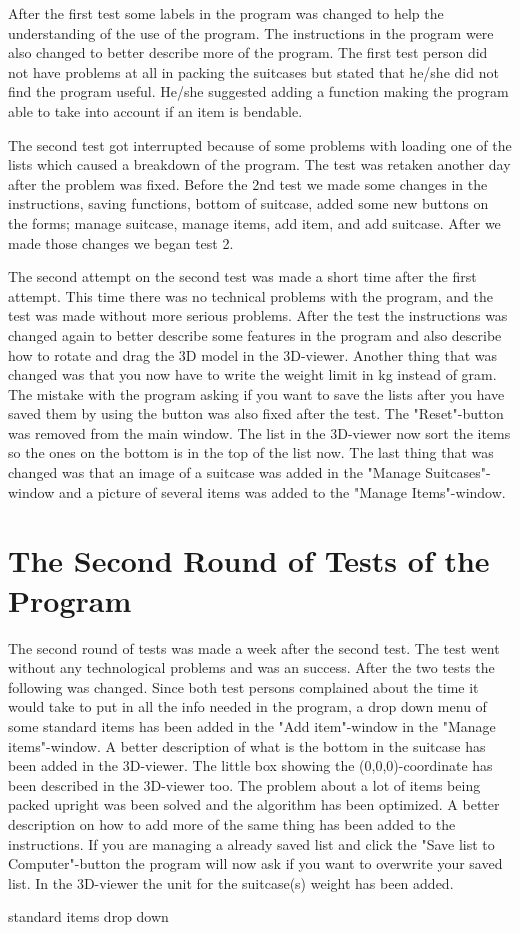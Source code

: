 After the first test some labels in the program was changed to help the understanding of the use of the program. The instructions in the program were also changed to better describe more of the program. The first test person did not have problems at all in packing the suitcases but stated that he/she did not find the program useful. He/she suggested adding a function making the program able to take into account if an item is bendable.

The second test got interrupted because of some problems with loading one of the lists which caused a breakdown of the program. The test was retaken another day after the problem was fixed. Before the 2nd test we made some changes in the instructions, saving functions, bottom of suitcase, added some new buttons on the forms; manage suitcase, manage items, add item, and add suitcase. After we made those changes we began test 2.

The second attempt on the second test was made a short time after the first attempt. This time there was no technical problems with the program, and the test was made without more serious problems. After the test the instructions was changed again to better describe some features in the program and also describe how to rotate and drag the 3D model in the 3D-viewer. Another thing that was changed was that you now have to write the weight limit in kg instead of gram. The mistake with the program asking if you want to save the lists after you have saved them by using the button was also fixed after the test. The "Reset"-button  was removed from the main window. The list in the 3D-viewer now sort the items so the ones on the bottom is in the top of the list now. The last thing that was changed was that an image of a suitcase was added in the "Manage Suitcases"-window and a picture of several items was added to the "Manage Items"-window.

\section{The Second Round of Tests of the Program}

The second round of tests was made a week after the second test. The test went without any technological problems and was an success. After the two tests the following was changed. Since both test persons complained about the time it would take to put in all the info needed in the program, a drop down menu of some standard items has been added in the "Add item"-window in the "Manage items"-window. A better description of what is the bottom in the suitcase has been added in the 3D-viewer. The little box showing the (0,0,0)-coordinate has been described in the 3D-viewer too. The problem about a lot of items being packed upright was been solved and the algorithm has been optimized. A better description on how to add more of the same thing has been added to the instructions. If you are managing a already saved list and click the "Save list to Computer"-button the program will now ask if you want to overwrite your saved list. In the 3D-viewer the unit for the suitcase(s) weight has been added. 

standard items drop down



